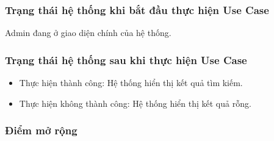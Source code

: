 \subsubsection{Trạng thái hệ thống khi bắt đầu thực hiện Use Case}
Admin đang ở giao diện chính của hệ thống.

\subsubsection{Trạng thái hệ thống sau khi thực hiện Use Case}
\begin{itemize}
  \item Thực hiện thành công: Hệ thống hiển thị kết quả tìm kiếm.
  \item Thực hiện không thành công: Hệ thống hiển thị kết quả rỗng.
\end{itemize}

\subsubsection{Điểm mở rộng}